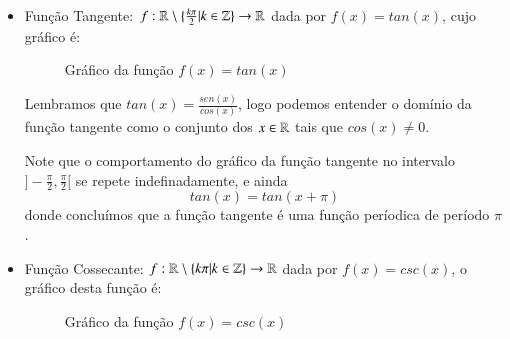 \begin{itemize}
  \item Função Tangente: $f: \mathbb{R} \setminus \{\frac{k\pi}{2} | k \in \mathbb{Z}\} \rightarrow \mathbb{R}$ dada por $f(x)= tan (x)$, cujo gráfico é:

  \begin{figure}[H]
  \centering
    \caption{Gráfico da função $f(x)= tan (x)$}
  \end{figure}
    
  Lembramos que $tan(x)= \frac{sen(x)}{cos(x)}$, logo podemos entender o domínio da função tangente como o conjunto dos $x \in \mathbb{R}$ tais que $cos(x) \neq 0$.
  
  Note que o comportamento do gráfico da função tangente no intervalo $]-\frac{\pi}{2}, \frac{\pi}{2}[$ se repete indefinadamente, e ainda
  \[tan(x)= tan(x + \pi)\]
  donde concluímos que a função tangente é uma função períodica de período $\pi$.

  \item Função Cossecante: $f: \mathbb{R} \setminus \{ k\pi | k \in \mathbb{Z}\} \rightarrow \mathbb{R}$ dada por $f(x)= csc(x)$, o gráfico desta função é: 

  \begin{figure}[H]
  \centering
    \caption{Gráfico da função $f(x)= csc(x)$}
  \end{figure}
    

\end{itemize}

